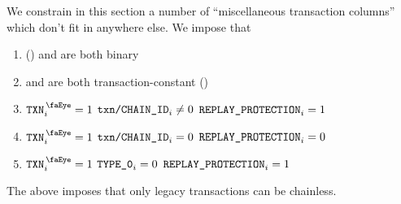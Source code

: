 We constrain in this section a number of ``miscellaneous transaction columns'' which don't fit in anywhere else.
We impose that
\begin{enumerate}
    \item \rlpTxnCommonColumnReplayProtection{} (\sanityCheck) and \rlpTxnCommonColumnYparity{} are both binary
    \item \rlpTxnCommonColumnReplayProtection{} and \rlpTxnCommonColumnYparity{} are both transaction-constant (\sanityCheck)
    \item \If $\isTxn _{i} = 1$ \et $\texttt{txn}\texttt{/}\texttt{{CHAIN\_ID}} _{i} \neq 0$ \Then $\texttt{REPLAY\_PROTECTION} _{i} = 1$
    \item \If $\isTxn _{i} = 1$ \et $\texttt{txn}\texttt{/}\texttt{{CHAIN\_ID}} _{i} =    0$ \Then $\texttt{REPLAY\_PROTECTION} _{i} = 0$
    \item \If $\isTxn _{i} = 1$ \et $\texttt{TYPE\_0}                     _{i} =    0$ \Then $\texttt{REPLAY\_PROTECTION} _{i} = 1$
\end{enumerate}
\saNote{} \label{rlp txn v2: generalities: transaction decoding: non legacy transaction can't be chainless}
The above imposes that only legacy transactions can be chainless.
